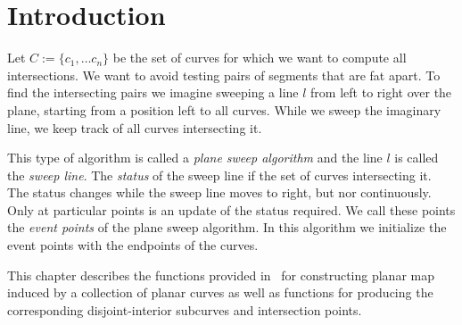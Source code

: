 \section{Introduction}

Let $C:=\{c_1, \ldots c_n\}$ be the set of curves for which we want 
to compute all intersections. We want to avoid testing pairs of segments 
that are fat apart. To find the intersecting pairs we imagine sweeping  
a line $l$ from left to right over the plane, starting from a position 
left to all curves. While we sweep the imaginary line, we keep track of all 
curves intersecting it.

This type of algorithm is called a {\em plane sweep algorithm} and the line 
$l$ is called the {\em sweep line}. The {\em status} of the sweep line if 
the set of curves intersecting it. The status changes while the sweep line 
moves to right, but nor continuously. Only at particular points is an update of the status required. We call these points the {\em event points} of the 
plane sweep algorithm. In this algorithm we initialize the event points with 
the endpoints of the curves.


This chapter describes the functions provided in
\cgal\ for constructing planar map induced by a collection of planar curves 
as well as functions for producing the corresponding disjoint-interior 
subcurves and intersection points.
